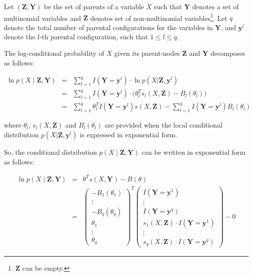 \documentclass[11pt, oneside]{article}   	%
\newcommand{\bm}{\mathbf}
\numberwithin{figure}{section}
\numberwithin{equation}{section}
\numberwithin{table}{section}
\theoremstyle{definition}
\begin{document}
Let $(\bm Z, \bm Y)$ be the set of parents of a variable $X$ such that $\mathbf{Y}$ denotes a set of multinomial variables and $\bm Z$ denotes set of non-multinomial variables\footnote{$\bm Z$ can be empty.}.  Let $q$ denote the total number of parental configurations for the variables in $\bm Y$, and $\mathbf{y}^l$ denote the $l$-th parental configuration, such that $1 \leq l \leq q$.

The log-conditional probability of $X$ given its parent-nodes $\bm Z$ and $\mathbf{Y}$ decomposes as  follows:

\begin{eqnarray*}
\ln p(X \mid \bm Z, \bm Y) &=&  \sum_{l=1}^q I(\mathbf{Y} =\mathbf{y}^l) \cdot \ln p(X | \bm Z, \mathbf{y}^l) \\
&=& \sum_{l=1}^q I(\mathbf{Y} =\mathbf{y}^l) \cdot \Big(  \theta_{l}^T s_l(X, \bm Z)  -  B_l(\theta_{l}) \Big)\\
&=& \sum_{l=1}^q \theta_{l}^T  I(\mathbf{Y} =\mathbf{y}^l) s(X, \bm Z) - \sum_{l=1}^q I(\mathbf{Y} =\mathbf{y}^l) B_l(\theta_{l})
\end{eqnarray*}

\noindent where $\theta_l$, $s_l(X,\bm Z)$ and $B_l(\theta_l)$ are provided when the local conditional distribution $p(X | \bm Z, \mathbf{y}^l)$ is expressed in exponential form. 

So, the conditional distribution $p(X \mid \bm Z, \bm Y)$ can be written in exponential form as follows: 

\begin{eqnarray}
\label{Equation:CD_With_MParents:Representation}
\ln p(X \mid \bm Z, \bm Y)  &=& \theta^T s(X,\mathbf{Y}) - B(\theta) \nonumber \\
&=&
\begin{pmatrix}
- B_1(\theta_{1}) \\
\vdots \\
- B_q(\theta_{q}) \\
\theta_{1} \\
\vdots \\
\theta_{q}
\end{pmatrix}^T
\begin{pmatrix}
I(\mathbf{Y} =\mathbf{y}^1) \\
\vdots \\
I(\mathbf{Y} =\mathbf{y}^q) \\
s_1(X, \bm Z) \cdot I(\mathbf{Y} =\mathbf{y}^1) \\
\vdots \\
s_q(X, \bm Z) \cdot I(\mathbf{Y} =\mathbf{y}^q)
\end{pmatrix}
- 0 
\end{eqnarray}
\end{document}
